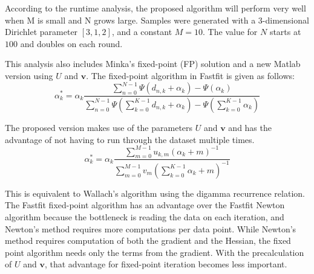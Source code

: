 \documentclass[twoside]{article}
\begin{document}
According to the runtime analysis, the proposed algorithm will perform very well when M is small and N grows large.  Samples were generated with a 3-dimensional Dirichlet parameter $[3,1,2]$, and a constant $M = 10$.  The value for $N$ starts at $100$ and doubles on each round.

This analysis also includes Minka's fixed-point (FP) solution and a new Matlab version using $U$ and $\mathbf{v}$.  The fixed-point algorithm in Fastfit is given as follows:
\begin{equation}
\alpha_k^{*}= \alpha_k\frac{\sum_{n=0}^{N-1}\Psi(d_{n,k}+\alpha_k)-\Psi(\alpha_k)}{\sum_{n=0}^{N-1}\Psi(\sum_{k=0}^{K-1}d_{n,k}+\alpha_k)-\Psi(\sum_{k=0}^{K-1}\alpha_k)}
\end{equation}

The proposed version makes use of the parameters $U$ and $\mathbf{v}$ and has the advantage of not having to run through the dataset multiple times.
\begin{equation}
\alpha_k^{*}= \alpha_k\frac{\sum_{m=0}^{M-1}u_{k,m}(\alpha_k+m)^{-1}}{\sum_{m=0}^{M-1}v_m\left(\sum_{k=0}^{K-1}\alpha_k+m\right)^{-1}}
\end{equation}

This is equivalent to Wallach's algorithm using the digamma recurrence relation\cite{wallach}. The Fastfit fixed-point algorithm has an advantage over the Fastfit Newton algorithm because the bottleneck is reading the data on each iteration, and Newton's method requires more computations per data point.  While Newton's method requires computation of both the gradient and the Hessian, the fixed point algorithm needs only the terms from the gradient.  With the precalculation of $U$ and $\mathbf{v}$, that advantage for fixed-point iteration becomes less important.
\end{document}
